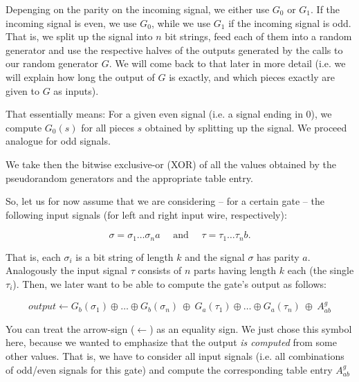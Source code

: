 \message{ !name(seminar.tex)}\documentclass{llncs}
\begin{document}
Depenging on the parity on the incoming signal, we either use $G_0$ or $G_1$. If the incoming signal is even, we use $G_0$, while we use $G_1$ if the incoming signal is odd. That is, we split up the signal into $n$ bit strings, feed each of them into a random generator and use the respective halves of the outputs generated by the calls to our random generator $G$. We will come back to that later in more detail (i.e. we will explain how long the output of $G$ is exactly, and which pieces exactly are given to $G$ as inputs). 

That essentially means: For a given even signal (i.e. a signal ending in 0), we compute $G_0(s)$ for all pieces $s$ obtained by splitting up the signal. We proceed analogue for odd signals.


We take then the bitwise exclusive-or (XOR) of all the values obtained by the pseudorandom generators and the appropriate table entry.

So, let us for now assume that we are considering -- for a certain gate -- the following input signals (for left and right input wire, respectively):

\begin{equation*}
  \sigma=\sigma_1\dots\sigma_na  \quad \text{ and }\quad \tau=\tau_1\dots\tau_nb.
\end{equation*}

That is, each $\sigma_i$ is a bit string of length $k$ and the signal $\sigma$ has parity $a$. Analogously the input signal $\tau$ consists of $n$ parts having length $k$ each (the single $\tau_i$). Then, we later want to be able to compute the gate's output as follows:

\begin{equation}
\label{eq:definition-of-output-of-a-gate-dependent-of-gate-label}
  output \gets G_b(\sigma_1)\oplus\dots\oplus G_b(\sigma_n) \ \oplus \ G_a(\tau_1)\oplus\dots\oplus G_a(\tau_n) \ \oplus \ A_{ab}^g
\end{equation}

You can treat the arrow-sign ($\gets$) as an equality sign. We just chose this symbol here, because we wanted to emphasize that the output \emph{is computed} from some other values. That is, we have to consider all input signals (i.e. all combinations of odd/even signals for this gate) and compute the corresponding table entry $A_{ab}^g$
\end{document}
